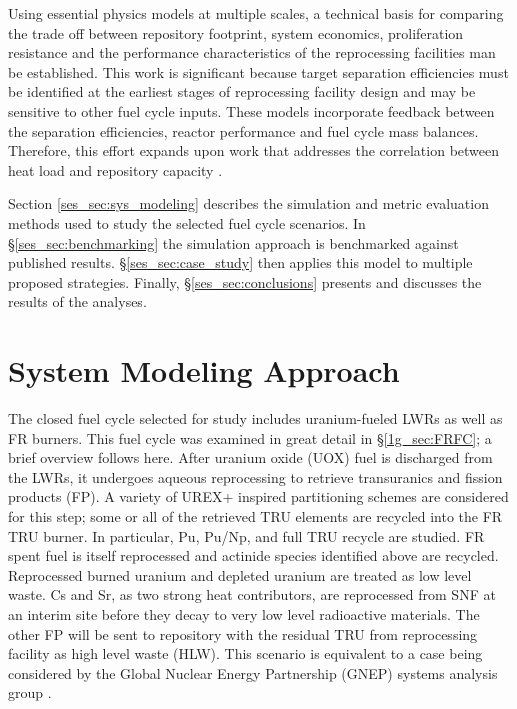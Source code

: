 Using essential physics models at multiple scales,
a technical basis for comparing the trade off between
repository footprint, system economics, proliferation resistance and
the performance characteristics of the reprocessing facilities man be established.  This
work is significant because target separation efficiencies must be
identified at the earliest stages of reprocessing facility design
and may be sensitive to other fuel cycle inputs.  These
models incorporate feedback between the separation efficiencies, reactor
performance and fuel cycle mass balances.  Therefore, this effort
expands upon work that addresses the correlation between heat load
and repository capacity \cite{repmodel}.  

Section \ref{ses_sec:sys_modeling} describes the simulation and metric evaluation
methods used to study the selected fuel cycle scenarios.  In \S \ref{ses_sec:benchmarking}
the simulation approach is benchmarked against published results. \S \ref{ses_sec:case_study}
then applies this model to multiple proposed strategies.
Finally, \S \ref{ses_sec:conclusions} presents and discusses the results of the analyses.


\section{System Modeling Approach}
\label{ses_sec:sys_modeling}
The closed fuel cycle selected for study includes uranium-fueled LWRs
as well as FR burners.  This fuel cycle was examined in great detail in 
\S \ref{1g_sec:FRFC}; a brief overview follows here.  After uranium oxide 
(UOX) fuel is discharged from the LWRs, it undergoes aqueous reprocessing 
to retrieve transuranics and fission products (FP).  A variety of UREX+ inspired
partitioning schemes are considered for this step; some or all of the
retrieved TRU elements are recycled into the FR TRU burner.  In
particular, Pu, Pu/Np, and full TRU recycle are studied.  FR spent fuel
is itself reprocessed and actinide species identified above are
recycled. Reprocessed burned uranium and depleted uranium are treated as
low level waste. Cs and Sr, as two strong heat contributors, are
reprocessed from SNF at an interim site before they decay to very low
level radioactive materials. The other FP will be sent to repository
with the residual TRU from reprocessing facility as high level waste
(HLW).  This scenario is equivalent to a case being considered by the
Global Nuclear Energy Partnership (GNEP) systems analysis group \cite{Piet2004}. 


